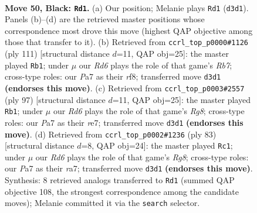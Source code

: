\documentclass[11pt]{article}
\begin{document}
\clearpage

\begin{figure}[p]\centering
\begin{subfigure}{0.46\textwidth}\centering
\resizebox{\linewidth}{!}{%
\newchessgame
\chessboard[
  setfen={8/p2p4/2p4k/5P2/4K3/3r4/8/8 b - - 2 50},
  showmover=false,
  pgfstyle=straightmove, color=movearrow, markmove={d3-d1}
]}
\caption{}
\end{subfigure}\hfill
\begin{subfigure}{0.46\textwidth}\centering
\resizebox{\linewidth}{!}{%
\newchessgame
\chessboard[
  setfen={5R2/8/kp6/8/2P5/2K5/1r6/8 b - - 11 56},
  showmover=false,
  pgfstyle=straightmove, color=movearrow, markmove={b2-b1}
]}
\caption{}
\end{subfigure}
\\[4pt]
\begin{subfigure}{0.46\textwidth}\centering
\resizebox{\linewidth}{!}{%
\newchessgame
\chessboard[
  setfen={6k1/4R3/8/6p1/8/5P1P/5K2/6r1 b - - 7 49},
  showmover=false,
  pgfstyle=straightmove, color=movearrow, markmove={g1-b1}
]}
\caption{}
\end{subfigure}\hfill
\begin{subfigure}{0.46\textwidth}\centering
\resizebox{\linewidth}{!}{%
\newchessgame
\chessboard[
  setfen={4k3/R7/8/2p5/6p1/2P1P3/5K2/6r1 b - - 1 42},
  showmover=false,
  pgfstyle=straightmove, color=movearrow, markmove={g1-c1}
]}
\caption{}
\end{subfigure}
\caption{\textbf{Move 50, Black: \texttt{Rd1}.} (a) Our position; Melanie plays \texttt{Rd1} (\texttt{d3d1}). Panels (b)--(d) are the retrieved master positions whose correspondence most drove this move (highest QAP objective among those that transfer to it). (b) Retrieved from \texttt{ccrl\_top\_p0000\#1126} (ply 111) [structural distance $d$=11, QAP obj=25]: the master played \texttt{Rb1}; under $\mu$ our \emph{Rd6} plays the role of that game's \emph{Rb7}; cross-type roles: our \emph{P}a7 as their \emph{r}f8; transferred move \texttt{d3d1} \textbf{(endorses this move)}. (c) Retrieved from \texttt{ccrl\_top\_p0003\#2557} (ply 97) [structural distance $d$=11, QAP obj=25]: the master played \texttt{Rb1}; under $\mu$ our \emph{Rd6} plays the role of that game's \emph{Rg8}; cross-type roles: our \emph{P}a7 as their \emph{r}e7; transferred move \texttt{d3d1} \textbf{(endorses this move)}. (d) Retrieved from \texttt{ccrl\_top\_p0002\#1236} (ply 83) [structural distance $d$=8, QAP obj=24]: the master played \texttt{Rc1}; under $\mu$ our \emph{Rd6} plays the role of that game's \emph{Rg8}; cross-type roles: our \emph{P}a7 as their \emph{r}a7; transferred move \texttt{d3d1} \textbf{(endorses this move)}. Synthesis: 8 retrieved analogs transferred to \texttt{Rd1} (summed QAP objective 108, the strongest correspondence among the candidate moves); Melanie committed it via the \texttt{search} selector.}
\label{fig:thought-m99}
\end{figure}
\end{document}
